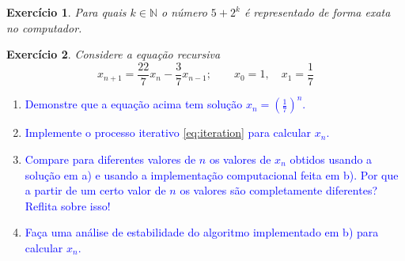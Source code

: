 \documentclass[a4paper,12pt]{article}
\theoremstyle{exer}
\newtheorem{exercise}{Exercício}
\theoremstyle{definition}
\newcommand{\enu}[1]{\textcolor{blue}{#1}}
\begin{document}
\begin{exercise}
    Para quais $k\in\mathbb{N}$ o número $5 + 2^k$ é representado de forma
    exata no computador. 
\end{exercise}

\begin{exercise}
    Considere a equação recursiva 
    \begin{equation}
        \label{eq:iteration}
        x_{n+1} = \frac{22}{7}x_n - \frac{3}{7}x_{n-1}; \qquad x_0 = 1, \quad x_1 = \frac{1}{7}
    \end{equation}
\end{exercise}

\begin{enumerate}
    \item \enu{Demonstre que a equação acima tem solução $x_n =
    \left(\frac{1}{7}\right)^n$.} 
    \item \enu{Implemente o processo iterativo \eqref{eq:iteration} para calcular
    $x_n$.}
    \item \enu{Compare para diferentes valores de $n$ os valores de $x_n$ obtidos
    usando a solução em a) e usando a implementação computacional feita em b).
    Por que a partir de um certo valor de $n$ os valores são completamente
    diferentes? Reflita sobre isso!}

    \item \enu{Faça uma análise de estabilidade do algoritmo implementado em b)
    para calcular $x_n$.}

\end{enumerate}
\end{document}
